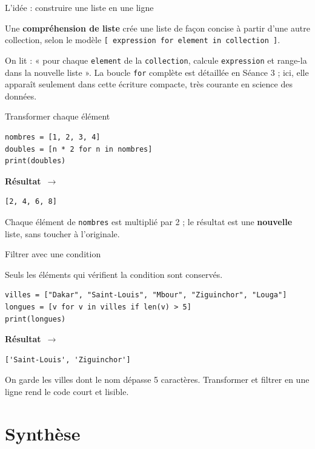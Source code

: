 \documentclass[aspectratio=169,11pt]{beamer}
\newcommand{\resultat}{{\scriptsize\textbf{R\'esultat}~$\rightarrow$}\par\vspace{1pt}}
\begin{document}
\begin{frame}{L'idée : construire une liste en une ligne}
\begin{ucaddef}
{\small Une \textbf{compréhension de liste} crée une liste de façon concise à partir d'une autre collection, selon le modèle \texttt{[ expression for element in collection ]}.}
\end{ucaddef}
{\small On lit : « pour chaque \texttt{element} de la \texttt{collection}, calcule \texttt{expression} et range-la dans la nouvelle liste ». La boucle \texttt{for} complète est détaillée en Séance 3 ; ici, elle apparaît seulement dans cette écriture compacte, très courante en science des données.}
\end{frame}

\begin{frame}[fragile]{Transformer chaque élément}
\begin{lstlisting}
nombres = [1, 2, 3, 4]
doubles = [n * 2 for n in nombres]
print(doubles)
\end{lstlisting}
\resultat
\begin{lstlisting}[style=out]
[2, 4, 6, 8]
\end{lstlisting}
{\small Chaque élément de \texttt{nombres} est multiplié par 2 ; le résultat est une \textbf{nouvelle} liste, sans toucher à l'originale.}
\end{frame}

\begin{frame}[fragile]{Filtrer avec une condition}
\begin{ucadex}
{\small Seuls les éléments qui vérifient la condition sont conservés.}
\end{ucadex}
\begin{lstlisting}
villes = ["Dakar", "Saint-Louis", "Mbour", "Ziguinchor", "Louga"]
longues = [v for v in villes if len(v) > 5]
print(longues)
\end{lstlisting}
\resultat
\begin{lstlisting}[style=out]
['Saint-Louis', 'Ziguinchor']
\end{lstlisting}
{\small On garde les villes dont le nom dépasse 5 caractères. Transformer et filtrer en une ligne rend le code court et lisible.}
\end{frame}

\section{Synthèse}
\end{document}
